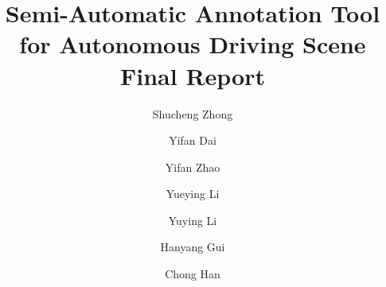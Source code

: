 \title[]{Semi-Automatic Annotation Tool for Autonomous Driving Scene
\texorpdfstring{\\}{}Final Report}

\author{Shucheng Zhong} 
\author{Yifan Dai}
\author{Yifan Zhao}
\author{Yueying Li}
\author{Yuying Li}
\author{Hanyang Gui}
\author{Chong Han}

\newcommand{\yifann}[1]{\noindent{\textcolor{brown}{\bf \fbox{YD} {\it#1}}}}
\newcommand{\yueying}[1]{\noindent{\textcolor{magenta}{\bf \fbox{YY} {\it#1}}}}
\newcommand{\yuying}[1]{\noindent{\textcolor{blue}{\bf \fbox{YuY} {\it#1}}}}
\newcommand{\yifanz}[1]{\noindent{\textcolor[rgb]{0,0.4,0.6}{{\bf \fbox{YZ}} {\it#1}}}}
\newcommand{\shucheng}[1]{\noindent{\textcolor[rgb]{0.36, 0.54, 0.66}{\bf \fbox{SC} {\bf#1}}}}
\newcommand{\tofix}[1]{\noindent{\color{red}{#1}}}
